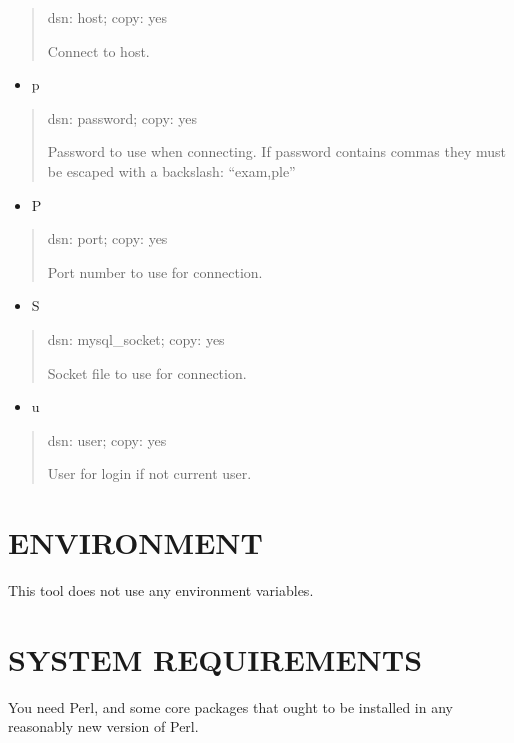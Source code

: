 \documentclass[letterpaper,10pt,english]{sphinxmanual}
\begin{document}
\begin{quote}

dsn: host; copy: yes

Connect to host.
\end{quote}
\begin{itemize}
\item {} 
p

\end{itemize}
\begin{quote}

dsn: password; copy: yes

Password to use when connecting.
If password contains commas they must be escaped with a backslash: “exam,ple”
\end{quote}
\begin{itemize}
\item {} 
P

\end{itemize}
\begin{quote}

dsn: port; copy: yes

Port number to use for connection.
\end{quote}
\begin{itemize}
\item {} 
S

\end{itemize}
\begin{quote}

dsn: mysql\_socket; copy: yes

Socket file to use for connection.
\end{quote}
\begin{itemize}
\item {} 
u

\end{itemize}
\begin{quote}

dsn: user; copy: yes

User for login if not current user.
\end{quote}


\section{ENVIRONMENT}
\label{\detokenize{mariadb-index-checker:environment}}
This tool does not use any environment variables.


\section{SYSTEM REQUIREMENTS}
\label{\detokenize{mariadb-index-checker:system-requirements}}
You need Perl, and some core packages that ought to be installed in any
reasonably new version of Perl.
\end{document}
